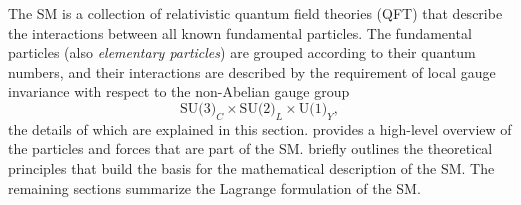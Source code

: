 

The SM is a collection of relativistic quantum field theories (QFT) that describe the interactions between all known fundamental particles. 
The fundamental particles (also \emph{elementary particles}) are grouped according to their quantum numbers, and their interactions are described by the requirement of local gauge invariance with respect to the non-Abelian gauge group
\begin{equation}
  \label{eq:sm-gauge-group}
  \text{SU(3)}_C \times \text{SU(2)}_L \times \text{U(1)}_Y,
\end{equation}
the details of which are explained in this section.
 provides a high-level overview of the particles and forces that are part of the SM.  briefly outlines the theoretical principles that build the basis for the mathematical description of the SM. The remaining sections summarize the Lagrange formulation of the SM.
